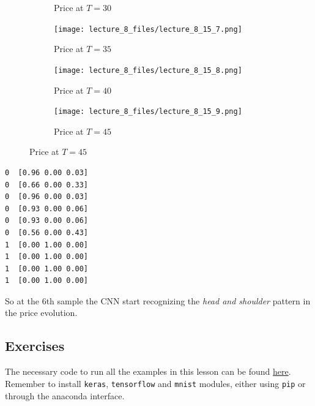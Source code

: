 \documentclass[11pt]{article}
\begin{document}
\begin{figure}
\begin{subfigure}{.45\textwidth}
    \caption{Price at $T=30$}
  \end{subfigure}
  \begin{subfigure}{.45\textwidth}
    \centering    
    \texttt{[image: lecture\_8\_files/lecture\_8\_15\_7.png]}
    \caption{Price at $T=35$}    
  \end{subfigure}
  \newline
  \begin{subfigure}{.45\textwidth}
    \centering
    \texttt{[image: lecture\_8\_files/lecture\_8\_15\_8.png]}
    \caption{Price at $T=40$}
  \end{subfigure}
  \begin{subfigure}{.45\textwidth}
    \centering    
    \texttt{[image: lecture\_8\_files/lecture\_8\_15\_9.png]}
    \caption{Price at $T=45$}    
  \end{subfigure}
\end{figure}
\newpage
    \begin{Verbatim}[commandchars=\\\{\}]
0  [0.96 0.00 0.03]
0  [0.66 0.00 0.33]
0  [0.96 0.00 0.03]
0  [0.93 0.00 0.06]
0  [0.93 0.00 0.06]
0  [0.56 0.00 0.43]
1  [0.00 1.00 0.00]
1  [0.00 1.00 0.00]
1  [0.00 1.00 0.00]
1  [0.00 1.00 0.00]
    \end{Verbatim}

    So at the 6th sample the CNN start recognizing the \emph{head and
shoulder} pattern in the price evolution.

    \hypertarget{exercises}{%
\subsection{Exercises}\label{exercises}}

The necessary code to run all the examples in this lesson can be found \href{https://repl.it/@MatteoSani/exercises8}{here}. Remember to install \verb|keras|, \verb|tensorflow| and \verb|mnist| modules, either using \verb|pip| or through the anaconda interface.
\end{document}
